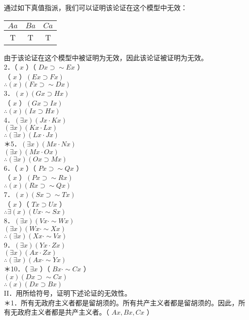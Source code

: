 通过如下真值指派，我们可以证明该论证在这个模型中无效：

\begin{center}
\begin{tabular}{|ccc|}
\hline
$A a$ & $B a$ & $C a$ \\
\hline
T & T & T \\
\hline
\end{tabular}
\end{center}

由于该论证在这个模型中被证明为无效，因此该论证被证明为无效。\\
2．（ $x$ ）（ $D x \supset \sim E x$ ）\\
（ $x$ ）$(E x \supset F x)$\\
$\therefore(x)(F x \supset \sim D x)$\\
3．$(x)(G x \supset H x)$\\
（ $x$ ）$(G x \supset I x)$\\
$\therefore(x)(I x \supset H x)$\\
4．$(\exists x)(J x \cdot K x)$\\
$(\exists x)(K x \cdot L x)$\\
$\therefore(\exists x)(L x \cdot J x)$\\
＊5．$(\exists x)(M x \cdot N x)$\\
$(\exists x)(M x \cdot O x)$\\
$\therefore(\exists x)(O x \supset M x)$\\
6．（ $x$ ）（ $P x \supset \sim Q x$ ）\\
（ $x$ ）$(P x \supset \sim R x)$\\
$\therefore(x)(R x \supset \sim Q x)$\\
7．$(x)(S x \supset \sim T x)$\\
（ $x$ ）（ $T x \supset U x$ ）\\
$\therefore \exists(x)(U x \cdot \sim S x)$\\
8．$(\exists x)(V x \cdot \sim W x)$\\
$(\exists x)(W x \cdot \sim X x)$\\
$\therefore(\exists x)(X x \cdot \sim V x)$\\
9．$(\exists x)(Y x \cdot Z x)$\\
$(\exists x)(A x \cdot Z x)$\\
$\therefore(\exists x)(A x \cdot \sim Y x)$\\
＊10．（ $\exists x$ ）（ $B x \cdot \sim C x$ ）\\
$(x)(D x \supset \sim C x)$\\
$\therefore(x)(D x \supset B x)$\\
II．用所给符号，证明下述论证的无效性。\\
＊1．所有无政府主义者都是留胡须的。所有共产主义者都是留胡须的。因此，所有无政府主义者都是共产主义者。（ $A x, B x, C x$ ）


